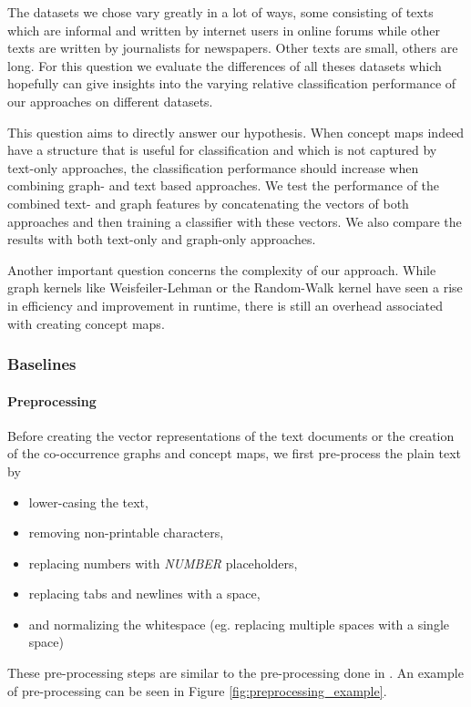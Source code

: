 The datasets we chose vary greatly in a lot of ways, some consisting of texts which are informal and written by internet users in online forums while other texts are written by journalists for newspapers.
Other texts are small, others are long.
For this question we evaluate the differences of all theses datasets which hopefully can give insights into the varying relative classification performance of our approaches on different datasets.

This question aims to directly answer our hypothesis. 
When concept maps indeed have a structure that is useful for classification and which is not captured by text-only approaches, the classification performance should increase when combining graph- and text based approaches.
We test the performance of the combined text- and graph features by concatenating the vectors of both approaches and then training a classifier with these vectors.
We also compare the results with both text-only and graph-only approaches.

Another important question concerns the complexity of our approach.
While graph kernels like Weisfeiler-Lehman or the Random-Walk kernel have seen a rise in efficiency and improvement in runtime, there is still an overhead associated with creating concept maps.

\subsubsection{Baselines}
\paragraph{Preprocessing}
Before creating the vector representations of the text documents or the creation of the co-occurrence graphs and concept maps, we first pre-process the plain text by

\begin{itemize}
\item{lower-casing the text,}
\item{removing non-printable characters,}
\item{replacing numbers with \textit{NUMBER} placeholders,}
\item{replacing tabs and newlines with a space,}
\item{and normalizing the whitespace (eg. replacing multiple spaces with a single space)}
\end{itemize}
These pre-processing steps are similar to the pre-processing done in \cite{Cachopo2007}.
An example of pre-processing can be seen in Figure \ref{fig:preprocessing_example}.

